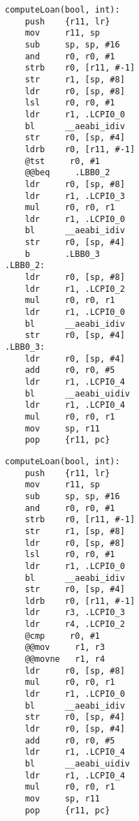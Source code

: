 \begin{minipage}{0.45\textwidth}
    \begin{lstlisting}[style=AsmStyle, basicstyle=\fontsize{4}{5}\selectfont\ttfamily]
computeLoan(bool, int):
    push    {r11, lr}
    mov     r11, sp
    sub     sp, sp, #16
    and     r0, r0, #1
    strb    r0, [r11, #-1]
    str     r1, [sp, #8]
    ldr     r0, [sp, #8]
    lsl     r0, r0, #1
    ldr     r1, .LCPI0_0
    bl      __aeabi_idiv
    str     r0, [sp, #4]
    ldrb    r0, [r11, #-1]
    @tst     r0, #1
    @@beq     .LBB0_2
    ldr     r0, [sp, #8]
    ldr     r1, .LCPI0_3
    mul     r0, r0, r1
    ldr     r1, .LCPI0_0
    bl      __aeabi_idiv
    str     r0, [sp, #4]
    b       .LBB0_3
.LBB0_2:
    ldr     r0, [sp, #8]
    ldr     r1, .LCPI0_2
    mul     r0, r0, r1
    ldr     r1, .LCPI0_0
    bl      __aeabi_idiv
    str     r0, [sp, #4]
.LBB0_3:
    ldr     r0, [sp, #4]
    add     r0, r0, #5
    ldr     r1, .LCPI0_4
    bl      __aeabi_uidiv
    ldr     r1, .LCPI0_4
    mul     r0, r0, r1
    mov     sp, r11
    pop     {r11, pc}
    \end{lstlisting}
\end{minipage}%
\hspace{1cm}
\begin{minipage}{0.45\textwidth}
    \begin{lstlisting}[style=AsmStyle, numbers=right,  basicstyle=\fontsize{4}{5}\selectfont\ttfamily, belowskip=8.5\baselineskip]
computeLoan(bool, int):
    push    {r11, lr}
    mov     r11, sp
    sub     sp, sp, #16
    and     r0, r0, #1
    strb    r0, [r11, #-1]
    str     r1, [sp, #8]
    ldr     r0, [sp, #8]
    lsl     r0, r0, #1
    ldr     r1, .LCPI0_0
    bl      __aeabi_idiv
    str     r0, [sp, #4]
    ldrb    r0, [r11, #-1]
    ldr     r3, .LCPI0_3
    ldr     r4, .LCPI0_2
    @cmp     r0, #1
    @@mov     r1, r3
    @@movne   r1, r4
    ldr     r0, [sp, #8]
    mul     r0, r0, r1
    ldr     r1, .LCPI0_0
    bl      __aeabi_idiv
    str     r0, [sp, #4]
    ldr     r0, [sp, #4]
    add     r0, r0, #5
    ldr     r1, .LCPI0_4
    bl      __aeabi_uidiv
    ldr     r1, .LCPI0_4
    mul     r0, r0, r1
    mov     sp, r11
    pop     {r11, pc} 
    \end{lstlisting}
\end{minipage}%
